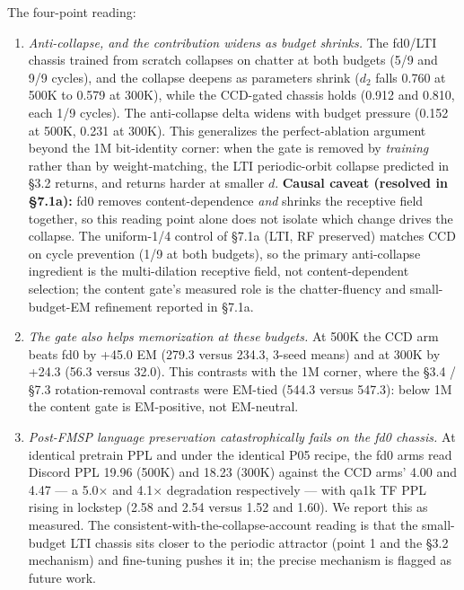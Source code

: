 \documentclass[11pt]{article}
\begin{document}
The four-point reading:

\begin{enumerate}
\item \emph{Anti-collapse, and the contribution widens as budget shrinks.} The fd0/LTI chassis trained from scratch collapses on chatter at both budgets (5/9 and 9/9 cycles), and the collapse deepens as parameters shrink ($d_2$ falls 0.760 at 500K to 0.579 at 300K), while the CCD-gated chassis holds (0.912 and 0.810, each 1/9 cycles). The anti-collapse delta widens with budget pressure (0.152 at 500K, 0.231 at 300K). This generalizes the perfect-ablation argument beyond the 1M bit-identity corner: when the gate is removed by \emph{training} rather than by weight-matching, the LTI periodic-orbit collapse predicted in \S3.2 returns, and returns harder at smaller $d$. \textbf{Causal caveat (resolved in \S7.1a):} fd0 removes content-dependence \emph{and} shrinks the receptive field together, so this reading point alone does not isolate which change drives the collapse. The uniform-1/4 control of \S7.1a (LTI, RF preserved) matches CCD on cycle prevention (1/9 at both budgets), so the primary anti-collapse ingredient is the multi-dilation receptive field, not content-dependent selection; the content gate's measured role is the chatter-fluency and small-budget-EM refinement reported in \S7.1a.

\item \emph{The gate also helps memorization at these budgets.} At 500K the CCD arm beats fd0 by +45.0 EM (279.3 versus 234.3, 3-seed means) and at 300K by +24.3 (56.3 versus 32.0). This contrasts with the 1M corner, where the \S3.4 / \S7.3 rotation-removal contrasts were EM-tied (544.3 versus 547.3): below 1M the content gate is EM-positive, not EM-neutral.

\item \emph{Post-FMSP language preservation catastrophically fails on the fd0 chassis.} At identical pretrain PPL and under the identical P05 recipe, the fd0 arms read Discord PPL 19.96 (500K) and 18.23 (300K) against the CCD arms' 4.00 and 4.47 --- a 5.0$\times$ and 4.1$\times$ degradation respectively --- with qa1k TF PPL rising in lockstep (2.58 and 2.54 versus 1.52 and 1.60). We report this as measured. The consistent-with-the-collapse-account reading is that the small-budget LTI chassis sits closer to the periodic attractor (point 1 and the \S3.2 mechanism) and fine-tuning pushes it in; the precise mechanism is flagged as future work.


\end{enumerate}
\end{document}
